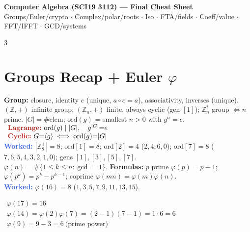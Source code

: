 \documentclass[9pt]{extarticle}
\newcommand{\hl}[1]{\textbf{\textcolor{BrickRed}{#1}}}
\newcommand{\ex}[1]{\textbf{\textcolor{RoyalBlue}{#1}}}
\newcommand{\sepline}{\vspace{1pt}{\color{RoyalBlue}\hrule}\vspace{3pt}}
\begin{document}
\footnotesize

\AddToShipoutPicture*{%
\AtTextUpperLeft{%
\raisebox{6pt}{\makebox[\textwidth][r]{\normalfont\scriptsize\textcolor{black!60}{Updated: 24 Sep 2026 00:42}}}%
}%
}
\begin{center}
\colorbox{RoyalBlue!15}{\parbox{0.97\linewidth}{\centering
{\bfseries\large\color{RoyalBlue} Computer Algebra (SCI19 3112) --- Final Cheat Sheet}\\[1.5pt]
{\scriptsize\color{RoyalBlue!70!black} Groups/Euler/crypto $\cdot$ Complex/polar/roots $\cdot$ Iso $\cdot$ FTA/fields $\cdot$ Coeff/value $\cdot$ FFT/IFFT $\cdot$ GCD/systems}}}
\end{center}
\sepline

\begin{multicols}{3}

\section{Groups Recap + Euler $\varphi$}
\begin{sloppypar}\raggedright
\textbf{Group:} closure, identity $e$ (unique, $a{\circ}e{=}a$), associativity, inverses (unique). $(\mathbb Z,{+})$ infinite group; $(\mathbb Z_n,{+})$ finite, always cyclic (gen $[1]$); $\mathbb Z_n^*$ group $\iff n$ prime. $|G|{=}\#$elem; $\mathrm{ord}(g)$ = smallest $n{>}0$ with $g^n{=}e$.\\
$\begin{array}{l}
\hl{Lagrange:}\ \mathrm{ord}(g)\mid|G|,\quad g^{|G|}{=}e\\
\hl{Cyclic:}\ G{=}\langle g\rangle\iff\mathrm{ord}(g){=}|G|
\end{array}$\\
\ex{Worked:} $|\mathbb Z_8^+|{=}8$; $\mathrm{ord}[1]{=}8$; $\mathrm{ord}[2]{=}4$ ($2,4,6,0$); $\mathrm{ord}[7]{=}8$ ($7,6,5,4,3,2,1,0$); gens $[1],[3],[5],[7]$.\\
$\varphi(n){=}\#\{1{\le}k{\le}n:\gcd{=}1\}$. \hl{Formulas:} $p$ prime $\varphi(p){=}p{-}1$; $\varphi(p^k){=}p^k{-}p^{k-1}$; coprime $\varphi(mn){=}\varphi(m)\varphi(n)$.\\
\ex{Worked:} $\varphi(16){=}8$ ($1,3,5,7,9,11,13,15$).
\end{sloppypar}
$\begin{array}{l}
\varphi(17)=16\\
\varphi(14)=\varphi(2)\varphi(7)=(2-1)(7-1)=1\cdot6=6\\
\varphi(9)=9-3=6\ \text{(prime power)}
\end{array}$
\begin{kbox}\raggedright

\end{kbox}
\end{multicols}
\end{document}
